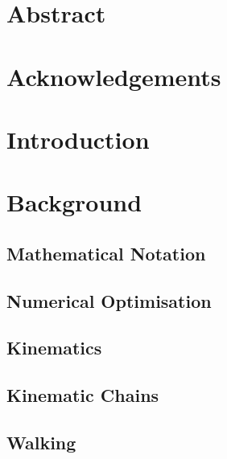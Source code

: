 \documentclass{UoNMCHA}
\begin{document}
	

	\vspace{-5mm}
	\section*{Abstract}
	\vspace{-3mm}
		

	\vspace{-2mm}
	\section*{Acknowledgements}
	\vspace{-3mm}
		

	\newpage\tableofcontents
	
	\newpage\section{Introduction}
		

	\newpage\section{Background}\label{sec:Background}
		\subsection{Mathematical Notation}
			
		\subsection{Numerical Optimisation}
			
		\subsection{Kinematics}
			
		\subsection{Kinematic Chains}
			
		\subsection{Walking}
			
	
\end{document}
